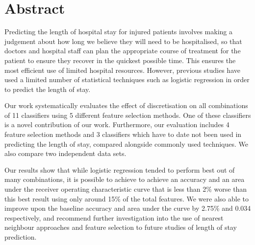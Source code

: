 \chapter*{Abstract}

Predicting the length of hospital stay for injured patients involves making a
judgement about how long we believe they will need to be hospitalised, so that
doctors and hospital staff can plan the appropriate course of treatment for the
patient to ensure they recover in the quickest possible time. This ensures the
most efficient use of limited hospital resources. However, previous studies
have used a limited number of statistical techniques such as logistic
regression in order to predict the length of stay.

Our work systematically
evaluates the effect of discretisation on all combinations of 11 classifiers
using 5 different feature selection methods. One of these classifiers is a
novel contribution of our work. Furthermore, our evaluation includes 4 feature
selection methods and 3 classifiers which have to date not been used in
predicting the length of stay, compared alongside commonly used
techniques. We also compare two independent data sets.

Our results show that while logistic regression tended to perform best out of
many combinations, it is possible to achieve to achieve an accuracy and an area
under the receiver operating characteristic curve that is less than 2\% worse
than this best result using only around 15\% of the total features. We were
also able to improve upon the baseline accuracy and area under the curve by
2.75\% and 0.034 respectively, and recommend further investigation into the
use of nearest neighbour approaches and feature selection to future studies
of length of stay prediction.
